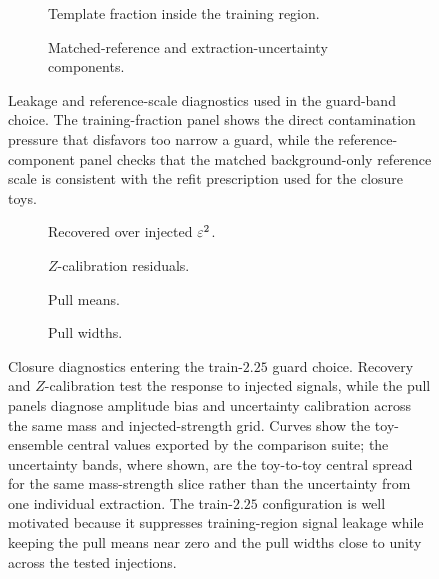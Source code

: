 \begin{figure}[H]
\centering
\begin{subfigure}[t]{0.78\linewidth}
  \centering
  \caption{Template fraction inside the training region.}
\end{subfigure}

\vspace{0.8em}

\begin{subfigure}[t]{0.78\linewidth}
  \centering
  \caption{Matched-reference and extraction-uncertainty components.}
\end{subfigure}
\caption{Leakage and reference-scale diagnostics used in the guard-band choice. The training-fraction panel shows the direct contamination pressure that disfavors too narrow a guard, while the reference-component panel checks that the matched background-only reference scale is consistent with the refit prescription used for the closure toys.}
\label{fig:guard-band-leakage-reference}
\end{figure}

\begin{figure}[H]
\centering
\begin{subfigure}[t]{0.49\linewidth}
  \centering
  \caption{Recovered over injected $\varepsilon^2$.}
\end{subfigure}
\hfill
\begin{subfigure}[t]{0.49\linewidth}
  \centering
  \caption{$Z$-calibration residuals.}
\end{subfigure}

\vspace{0.6em}

\begin{subfigure}[t]{0.49\linewidth}
  \centering
  \caption{Pull means.}
\end{subfigure}
\hfill
\begin{subfigure}[t]{0.49\linewidth}
  \centering
  \caption{Pull widths.}
\end{subfigure}
\caption{Closure diagnostics entering the train-$2.25$ guard choice. Recovery and $Z$-calibration test the response to injected signals, while the pull panels diagnose amplitude bias and uncertainty calibration across the same mass and injected-strength grid. Curves show the toy-ensemble central values exported by the comparison suite; the uncertainty bands, where shown, are the toy-to-toy central spread for the same mass-strength slice rather than the uncertainty from one individual extraction. The train-$2.25$ configuration is well motivated because it suppresses training-region signal leakage while keeping the pull means near zero and the pull widths close to unity across the tested injections.}
\label{fig:guard-band-closure-diagnostics}
\end{figure}

